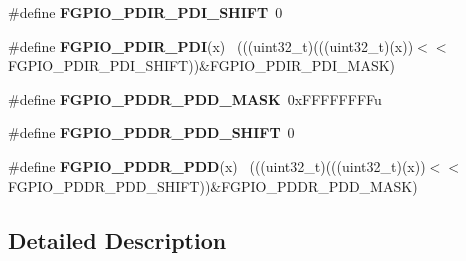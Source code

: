 \begin{DoxyCompactItemize}
\item 
\hypertarget{group___f_g_p_i_o___register___masks_gaadc2ff381ef7eb1254eaab329f935aae}{}\#define {\bfseries F\+G\+P\+I\+O\+\_\+\+P\+D\+I\+R\+\_\+\+P\+D\+I\+\_\+\+S\+H\+I\+F\+T}~0\label{group___f_g_p_i_o___register___masks_gaadc2ff381ef7eb1254eaab329f935aae}

\item 
\hypertarget{group___f_g_p_i_o___register___masks_ga6c257fc3a27a1d9f410409e335d64ef1}{}\#define {\bfseries F\+G\+P\+I\+O\+\_\+\+P\+D\+I\+R\+\_\+\+P\+D\+I}(x)                                            ~(((uint32\+\_\+t)(((uint32\+\_\+t)(x))$<$$<$F\+G\+P\+I\+O\+\_\+\+P\+D\+I\+R\+\_\+\+P\+D\+I\+\_\+\+S\+H\+I\+F\+T))\&F\+G\+P\+I\+O\+\_\+\+P\+D\+I\+R\+\_\+\+P\+D\+I\+\_\+\+M\+A\+S\+K)\label{group___f_g_p_i_o___register___masks_ga6c257fc3a27a1d9f410409e335d64ef1}

\item 
\hypertarget{group___f_g_p_i_o___register___masks_gad20f346c1d3d80b99ea1dc94aa53898d}{}\#define {\bfseries F\+G\+P\+I\+O\+\_\+\+P\+D\+D\+R\+\_\+\+P\+D\+D\+\_\+\+M\+A\+S\+K}~0x\+F\+F\+F\+F\+F\+F\+F\+Fu\label{group___f_g_p_i_o___register___masks_gad20f346c1d3d80b99ea1dc94aa53898d}

\item 
\hypertarget{group___f_g_p_i_o___register___masks_gaae41c1c9d3ee91071f4f2a58b771754e}{}\#define {\bfseries F\+G\+P\+I\+O\+\_\+\+P\+D\+D\+R\+\_\+\+P\+D\+D\+\_\+\+S\+H\+I\+F\+T}~0\label{group___f_g_p_i_o___register___masks_gaae41c1c9d3ee91071f4f2a58b771754e}

\item 
\hypertarget{group___f_g_p_i_o___register___masks_ga4125e443ff1a699046a828cdbe2c1e45}{}\#define {\bfseries F\+G\+P\+I\+O\+\_\+\+P\+D\+D\+R\+\_\+\+P\+D\+D}(x)                                            ~(((uint32\+\_\+t)(((uint32\+\_\+t)(x))$<$$<$F\+G\+P\+I\+O\+\_\+\+P\+D\+D\+R\+\_\+\+P\+D\+D\+\_\+\+S\+H\+I\+F\+T))\&F\+G\+P\+I\+O\+\_\+\+P\+D\+D\+R\+\_\+\+P\+D\+D\+\_\+\+M\+A\+S\+K)\label{group___f_g_p_i_o___register___masks_ga4125e443ff1a699046a828cdbe2c1e45}

\end{DoxyCompactItemize}


\subsection{Detailed Description}
